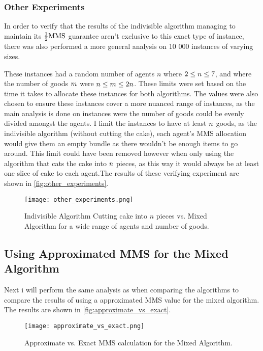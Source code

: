 \subsubsection{Other Experiments}\label{subsec:other-experiments}
In order to verify that the results of the indivisible algorithm managing to maintain its $\frac{1}{2}\text{MMS}$ guarantee aren't exclusive to this exact type of instance, there was also performed a more general analysis on 10 000 instances of varying sizes.

These instances had a random number of agents $n$ where $2\leq n\leq7$, and where the number of goods $m$ were $n\leq m\leq2n$. These limits were set based on the time it takes to allocate these instances for both algorithms. The values were also chosen to ensure these instances cover a more nuanced range of instances, as the main analysis is done on instances were the number of goods could be evenly divided amongst the agents. I limit the instances to have at least $n$ goods, as the indivisible algorithm (without cutting the cake), each agent's MMS allocation would give them an empty bundle as there wouldn't be enough items to go around. This limit could have been removed however when only using the algorithm that cats the cake into $n$ pieces, as this way it would always be at least one slice of cake to each agent.The results of these verifying experiment are shown in \autoref{fig:other_experiments}.

\begin{figure}
    \centering
    \texttt{[image: other\_experiments.png]}
    \caption{Indivisible Algorithm Cutting cake into $n$ pieces vs. Mixed Algorithm for a wide range of agents and number of goods.}
    \label{fig:other_experiments}
\end{figure}






\subsection{Using Approximated MMS for the Mixed Algorithm}
Next i will perform the same analysis as when comparing the algorithms to compare the results of using a approximated MMS value for the mixed algorithm. The results are shown in \autoref{fig:approximate_vs_exact}.


\begin{figure}
    \centering
    \texttt{[image: approximate\_vs\_exact.png]}
    \caption{Approximate vs. Exact MMS calculation for the Mixed Algorithm.}
    \label{fig:approximate_vs_exact}
\end{figure}

